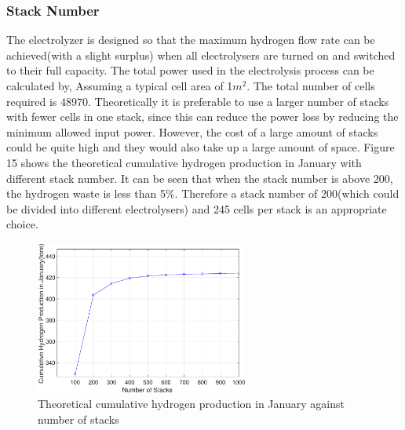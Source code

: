 \subsubsection{Stack Number}
The electrolyzer is designed so that the maximum hydrogen flow rate can be achieved(with a slight surplus) when all electrolysers are turned on and switched to their full capacity. The total power used in the electrolysis process can be calculated by,
Assuming a typical cell area of 1$m^2$. The total number of cells required is 48970. Theoretically it is preferable to use a larger number of stacks with fewer cells in one stack, since this can reduce the power loss by reducing the minimum allowed input power. However,  the cost of a large amount of stacks could be quite high and they would also take up a large amount of space. Figure 15 shows the theoretical cumulative hydrogen production in January with different stack number. It can be seen that when the stack number is above 200, the hydrogen waste is less than 5\%. Therefore a stack number of 200(which could be divided into different electrolysers) and 245 cells per stack is an appropriate choice.
 \begin{figure}[H] 
 \centering
\includegraphics[width=7cm]{stack.eps}
\caption{Theoretical cumulative hydrogen production in January against number of stacks}
\end{figure}
 

